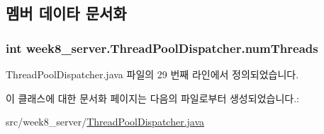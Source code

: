 \subsection{멤버 데이타 문서화}
\hypertarget{classweek8__server_1_1_thread_pool_dispatcher_af2930528df7e19e996420a857079ea69}{
\subsubsection[{num\-Threads}]{\setlength{\rightskip}{0pt plus 5cm}int week8\-\_\-server.\-Thread\-Pool\-Dispatcher.\-num\-Threads\hspace{0.3cm}{\ttfamily [private]}}}\label{classweek8__server_1_1_thread_pool_dispatcher_af2930528df7e19e996420a857079ea69}


Thread\-Pool\-Dispatcher.\-java 파일의 29 번째 라인에서 정의되었습니다.



이 클래스에 대한 문서화 페이지는 다음의 파일로부터 생성되었습니다.\-:\begin{DoxyCompactItemize}
\item 
src/week8\-\_\-server/\hyperlink{_thread_pool_dispatcher_8java}{Thread\-Pool\-Dispatcher.\-java}\end{DoxyCompactItemize}
